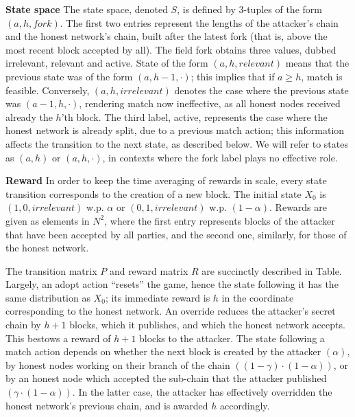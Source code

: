 \textbf{State space}
The state space, denoted $S$, is defined by 3-tuples of the form $(a, h, fork)$. The first two entries represent the lengths of the attacker’s chain and the honest network’s chain, built after the latest fork (that is, above the most recent block accepted by all). The field fork obtains three values, dubbed irrelevant, relevant and active. State of the form $(a, h, relevant)$ means that the previous state was of the form $(a, h - 1, \cdot)$; this implies that if $a \geq h$, match is feasible. Conversely, $(a, h, irrelevant)$ denotes the case where the previous state was $(a - 1, h, \cdot)$, rendering match now ineffective, as all honest nodes received already the $h$’th block. The third label, active, represents the case where the honest network is already split, due to a previous match action; this information affects the transition to the next state, as described below. We will refer to states as $(a, h)$ or $(a, h, \cdot)$, in contexts where the fork label plays no effective role.

\textbf{Reward}
In order to keep the time averaging of rewards in scale, every state transition corresponds to the creation of a new block. The initial state $X_0$ is $(1, 0, irrelevant)$ w.p. $\alpha$ or $(0, 1, irrelevant)$ w.p. $(1 - \alpha)$. Rewards are given as elements in $N^2$, where the first entry represents blocks of the attacker that have been accepted by all parties, and the second one, similarly, for those of the honest network.

The transition matrix $P$ and reward matrix $R$ are succinctly described in Table. Largely, an adopt action “resets” the game, hence the state following
it has the same distribution as $X_0$; its immediate reward is $h$ in the  coordinate corresponding to the honest network. An override reduces the attacker’s secret chain by $h+1$ blocks, which it publishes, and which the honest network accepts. This bestows a reward of $h + 1$ blocks to the attacker. The state following a match action depends on whether the next block is created by the attacker $(\alpha)$, by honest nodes working on their branch of the chain $((1 - \gamma) \cdot (1 - \alpha))$, or by an honest node which accepted the sub-chain that the attacker published $(\gamma \cdot (1-\alpha))$. In the latter case, the attacker has effectively overridden the honest network’s previous chain, and is awarded $h$ accordingly.

